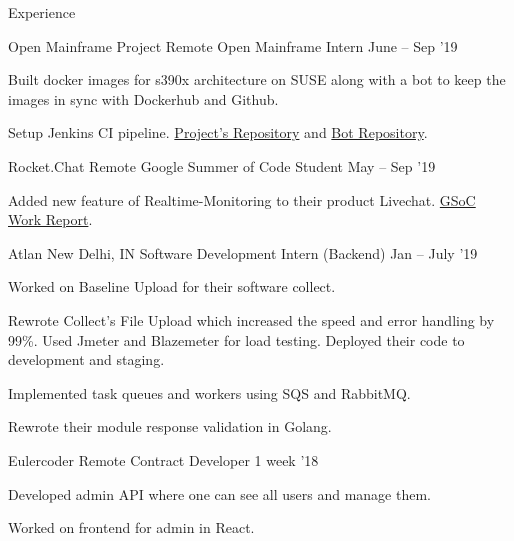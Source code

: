 \documentclass{resume} %
\begin{document}
\begin{rSection}{Experience}
  \begin{rWorkSection}{Open Mainframe Project}
                           {Remote}
                           {Open Mainframe Intern}
                           {June -- Sep '19}
  {
    \item Built docker images for s390x architecture on SUSE along with a bot to keep the images in sync with Dockerhub and Github.   
    \item Setup Jenkins CI pipeline. \href{https://github.com/openmainframeproject-internship/DockerHub-Development-Stacks/}{Project's Repository} and \href{https://github.com/knrt10/docker-hub-development-stacks-bot/}{Bot Repository}.  
  }                         
  \end{rWorkSection}

  \begin{rWorkSection}{Rocket.Chat}
                      {Remote}
                      {Google Summer of Code Student}
                      {May -- Sep '19}
  {
    \item Added new feature of Realtime-Monitoring to their product Livechat. \href{http://bit.ly/2kGqWt2}{GSoC Work Report}.
  }
  \end{rWorkSection}

  \begin{rWorkSection}{Atlan}
                     {New Delhi, IN}
                     {Software Development Intern (Backend)}
                     {Jan -- July '19}
  {
    \item Worked on Baseline Upload for their software collect. 
    \item Rewrote Collect's File Upload which increased the speed and error handling by 99\%. Used Jmeter and Blazemeter for load testing. Deployed their code to development and staging.
    \item Implemented task queues and workers using SQS and RabbitMQ.
    \item Rewrote their module response validation in Golang.
  }
  \end{rWorkSection}

  \begin{rWorkSection}{Eulercoder}
                     {Remote}
                     {Contract Developer}
                     {1 week '18}
  {
    \item Developed admin API where one can see all users and manage them.
    \item Worked on frontend for admin in React.
  }
  \end{rWorkSection}
\end{rSection}
\end{document}
